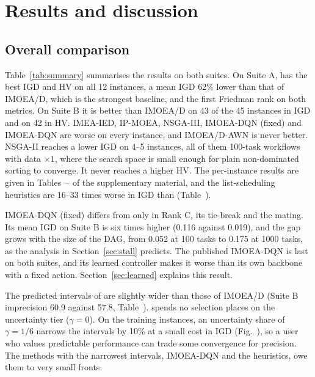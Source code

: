 \section{Results and discussion}
\label{sec:results}

\subsection{Overall comparison}
Table~\ref{tab:summary} summarises the results on both suites. On Suite A, \ours{} has the best IGD and HV on all 12
instances, a mean IGD 62\% lower than that of IMOEA/D, which is the strongest baseline, and the first Friedman rank on
both metrics. On Suite B it is better than IMOEA/D on 43 of the 45 instances in IGD and on 42 in HV. IMEA-IED, IP-MOEA,
NSGA-III, IMOEA-DQN (fixed) and IMOEA-DQN are worse on every instance, and IMOEA/D-AWN is never better. NSGA-II reaches a
lower IGD on 4--5 instances, all of them 100-task workflows with data $\times 1$, where the search space is small enough
for plain non-dominated sorting to converge. It never reaches a higher HV. The per-instance results are given in
Tables~-- of the supplementary material, and the list-scheduling
heuristics are 16--33 times worse in IGD than \ours{} (Table~).



IMOEA-DQN (fixed) differs from \ours{} only in Rank C, its tie-break and the mating. Its mean IGD on Suite B is six times higher (0.116
against 0.019), and the gap grows with the size of the DAG, from 0.052 at 100 tasks to 0.175 at 1000 tasks, as the
analysis in Section~\ref{sec:stall} predicts. The published IMOEA-DQN is last on both suites, and its learned controller
makes it worse than its own backbone with a fixed action. Section~\ref{sec:learned} explains this result.

The predicted intervals of \ours{} are slightly wider than those of IMOEA/D (Suite B imprecision 60.9 against 57.8,
Table~). \ours{} spends no selection places on the uncertainty tier ($\gamma = 0$). On the
training instances, an uncertainty share of $\gamma = 1/6$ narrows the intervals by 10\% at a small cost in IGD
(Fig.~), so a user who values predictable performance can trade some convergence for precision.
The methods with the narrowest intervals, IMOEA-DQN and the heuristics, owe them to very small fronts.

